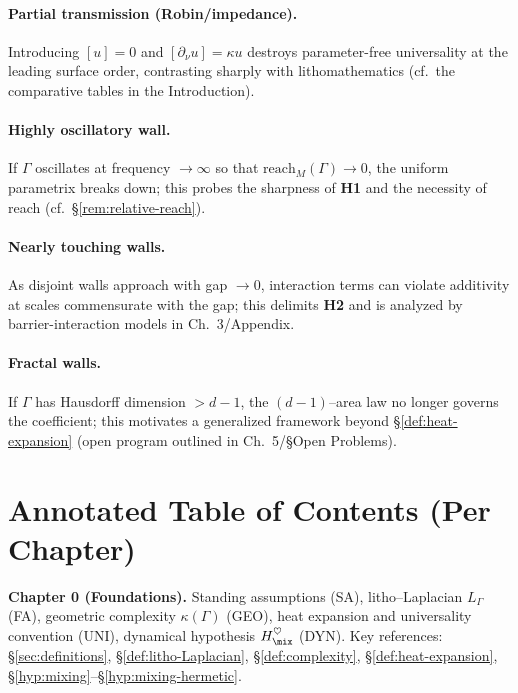 \paragraph{Partial transmission (Robin/impedance).}
Introducing $[u]=0$ and $[\partial_\nu u]=\kappa u$ destroys parameter-free universality at the leading surface order, contrasting sharply with lithomathematics (cf.\ the comparative tables in the Introduction).

\paragraph{Highly oscillatory wall.}
If $\Gamma$ oscillates at frequency $\to\infty$ so that $\mathrm{reach}_M(\Gamma)\to 0$, the uniform parametrix breaks down; this probes the sharpness of \textbf{H1} and the necessity of reach (cf.\ \S\ref{rem:relative-reach}).

\paragraph{Nearly touching walls.}
As disjoint walls approach with gap $\to 0$, interaction terms can violate additivity at scales commensurate with the gap; this delimits \textbf{H2} and is analyzed by barrier-interaction models in Ch.~3/Appendix.

\paragraph{Fractal walls.}
If $\Gamma$ has Hausdorff dimension $>d-1$, the $(d\!-\!1)$–area law no longer governs the coefficient; this motivates a generalized framework beyond \S\ref{def:heat-expansion} (open program outlined in Ch.~5/§Open Problems).

\medskip

\section{Annotated Table of Contents (Per Chapter)}\label{sec:annotated-toc}

\noindent\textbf{Chapter 0 (Foundations).}
Standing assumptions (SA), litho–Laplacian $L_\Gamma$ (FA), geometric complexity $\kappa(\Gamma)$ (GEO), heat expansion and universality convention (UNI), dynamical hypothesis $H_{\mix}^{\heartsuit}$ (DYN).
Key references: \S\ref{sec:definitions}, \S\ref{def:litho-Laplacian}, \S\ref{def:complexity}, \S\ref{def:heat-expansion}, \S\ref{hyp:mixing}–\S\ref{hyp:mixing-hermetic}.

